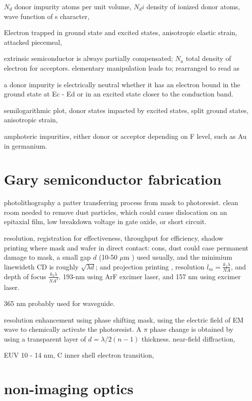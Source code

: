 $N_d$ donor impurity atoms per unit volume, $N_di$ density of ionized donor atoms, wave function of s character, 

Electron trapped in ground state and excited states, anisotropic elastic strain, attacked piecemeal, 

extrinsic semiconductor is always partially compensated; $N_a$ total density of electron for acceptors. elementary manipulation leads to; rearranged to read as

a donor impurity is electrically neutral whether it has an electron bound in the ground state at Ec - Ed or in an excited state closer to the conduction band. 

semilogarithmic plot, donor states impacted by excited states, split ground states, anisotropic strain, 

amphoteric impurities, either donor or acceptor depending on F level, such as Au in germanium. 

\section{Gary semiconductor fabrication} 

photolithography a patter transferring process from mask to photoresist. clean room needed to remove dust particles, which could cause dislocation on an epitaxial film, low breakdown voltage in gate oxide, or short circuit. 

resolution, registration for effectiveness, throughput for efficiency, shadow printing where mask and wafer in direct contact: cons, dust could case permanent damage to mask, a small gap $d$ (10-50 $\mu$m ) used usually, and the minimium linewideth CD is roughly $\sqrt{\lambda d}$; and projection printing , resolution $l_m = \frac{k_1 \lambda}{NA}$, and depth of focus $\frac{k_2 \lambda}{NA^2}$. 193-nm using ArF excimer laser, and 157 nm using  excimer laser. 

365 nm probably used for  waveguide. 

resolution enhancement using phase shifting mask,  using the electric field of EM wave to chemically activate the photoresist. A $\pi$ phase change is obtained by using a transparent layer of $d = \lambda/2(n - 1)$ thickness. near-field diffraction, 

EUV 10 - 14 nm, C inner shell electron transition, 


\section{non-imaging optics}

